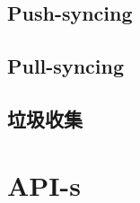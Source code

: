 \section{Push-syncing \statusorange}\label{spec:strategy:push-sync}


\section{Pull-syncing \statusorange}\label{spec:strategy:pull-sync}


\section{垃圾收集\statusorange}\label{spec:strategy:garbage-collection}


\chapter{API-s}\label{spec:api}


